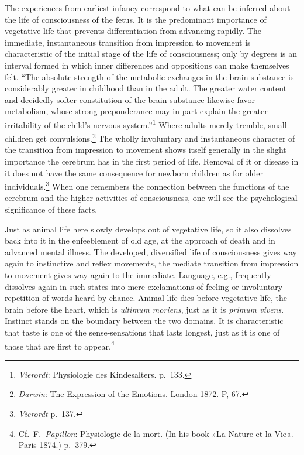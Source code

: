 \documentclass[12pt,a4paper]{book}
\newcommand{\opage}[1]{\marginnote{\footnotesize\textit{[#1]}}}
\begin{document}
The experiences from earliest infancy correspond to what can be inferred
about the life of consciousness of the fetus. It is the predominant
importance of vegetative life that prevents
\opage{109}differentiation from advancing rapidly. The immediate,
instantaneous transition from impression to movement is characteristic of
the initial stage of the life of consciousness; only by degrees is an
interval formed in which inner differences and oppositions can make
themselves felt. ``The absolute strength of the metabolic exchanges in
the brain substance is considerably greater in childhood than in the
adult. The greater water content and decidedly softer constitution of the
brain substance likewise favor metabolism, whose strong preponderance may
in part explain the greater irritability of the child's nervous
system.''\footnote{\emph{Vierordt}: Physiologie des Kindesalters.
p.~133.} Where adults merely tremble, small children get
convulsions.\footnote{\emph{Darwin}: The Expression of the Emotions.
London 1872. P, 67.} The wholly involuntary and instantaneous character
of the transition from impression to movement shows itself generally in
the slight importance the cerebrum has in the first period of life.
Removal of it or disease in it does not have the same consequence for
newborn children as for older individuals.\footnote{\emph{Vierordt}
p.~137.} When one remembers the connection between the functions of the
cerebrum and the higher activities of consciousness, one will see the
psychological significance of these facts.

Just as animal life here slowly develops out of vegetative life, so it
also dissolves back into it in the enfeeblement of old age, at the
approach of death and in advanced mental illness. The developed,
diversified life of consciousness gives way again to instinctive and
reflex movements, the mediate transition from impression to movement
gives way again to the immediate. Language, e.g., frequently dissolves
again in such states into mere exclamations of feeling or involuntary
repetition of words heard by chance. Animal life dies before vegetative
life, the brain before the heart, which is \textit{ultimum moriens}, just
as it is \textit{primum vivens}. Instinct stands on the boundary between
the two domains. It is characteristic that taste is one of the
sense-sensations that lasts longest, just as it is one of those that are
first to
appear.\footnote{Cf.\ F.~\emph{Papillon}: Physiologie de la mort. (In
his book »La Nature et la Vie«. Paris 1874.) p.~379.}
\end{document}
